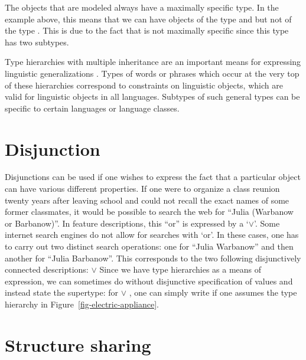 \addlines
The objects that are modeled always have a maximally specific type. In the example above, this means that we can have objects of the type  and 
but not of the type . This is due to the fact that  is not maximally specific since this type has two subtypes.

Type hierarchies with multiple inheritance are an important means for expressing linguistic generalizations \citep*{FPW85a,Flickinger87,Sag97a}. Types of words or phrases which
occur at the very top of these hierarchies correspond to constraints on linguistic objects, which are valid for linguistic objects in all languages. Subtypes of such general types
can be specific to certain languages or language classes.%

\section{Disjunction}

Disjunctions can be used if one wishes to express the fact that a particular object can have various different properties. If one were to organize a class reunion
twenty years after leaving school and could not recall the exact names of some former classmates, it would be possible to search the web for ``Julia (Warbanow or Barbanow)''. In
feature descriptions, this ``or'' is expressed by a `$\vee$'\is{$\vee$}.
\ea
{}
\z
Some internet search engines do not allow for searches with `or'. In these cases, one has to carry out two distinct search operations: one for ``Julia Warbanow'' and then another
for ``Julia Barbanow''. This corresponds to the two following disjunctively connected descriptions:
\ea
{} $\vee $
\z
Since we have type hierarchies as a means of expression, we can sometimes do without disjunctive specification of values and instead state the supertype:
for  $\vee$  , one can simply write  if one assumes the type hierarchy in Figure~\vref{fig-electric-appliance}.%

\section{Structure sharing}
\label{sec-strukturteilung}

